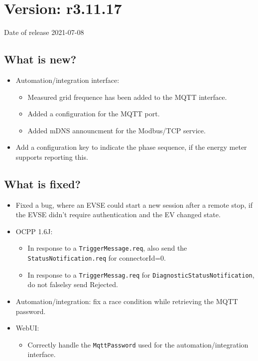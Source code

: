 \documentclass{scrartcl}
\begin{document}
\section{Version: r3.11.17}
Date of release 2021-07-08
\subsection*{What is new?}
\begin{itemize}
\item Automation/integration interface:
  \begin{itemize}
  \item Measured grid frequence has been added to the MQTT interface.
  \item Added a configuration for the MQTT port.
  \item Added mDNS announcment for the Modbus/TCP service.
  \end{itemize}
\item Add a configuration key to indicate the phase sequence, if the energy
  meter supports reporting this.
\end{itemize}
\subsection*{What is fixed?}
\begin{itemize}
\item Fixed a bug, where an EVSE could start a new session after a remote
  stop, if the EVSE didn't require authentication and the EV changed state.
\item OCPP 1.6J:
  \begin{itemize}
  \item In response to a \verb|TriggerMessage.req|, also send the
    \verb|StatusNotification.req| for connectorId=0.
  \item In response to a \verb|TriggerMessag.req| for
    \verb|DiagnosticStatusNotification|, do not falselsy send Rejected.
  \end{itemize}
\item Automation/integration: fix a race condition while retrieving the MQTT
  password.
\item WebUI:
  \begin{itemize}
  \item Correctly handle the \verb|MqttPassword| used for the
    automation/integration interface.
  \end{itemize}
\end{itemize}
\end{document}
